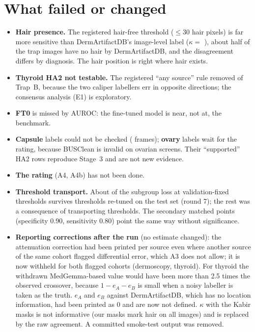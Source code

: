 \section{What failed or changed}
\begin{itemize}[leftmargin=*]\itemsep1pt
\item \textbf{Hair presence.} The registered hair-free threshold ($\le30$ hair pixels) is far more sensitive than
DermArtifactDB's image-level label ($\kappa=$ \sEightDermKappa), about half of the trap images have no hair by
DermArtifactDB, and the disagreement differs by diagnosis. The hair position is right where hair exists.
\item \textbf{Thyroid HA2 not testable.} The registered ``any source'' rule removed \sEightContratrapB{} of Trap~B, because
the two caliper labellers err in opposite directions; the consensus analysis (E1) is exploratory.
\item \textbf{FT0} is missed by \sEightFTZeroGap{} AUROC: the fine-tuned model is near, not at, the benchmark.
\item \textbf{Capsule} labels could not be checked (\sEightNCap{} frames); \textbf{ovary} labels wait for the rating,
because BUSClean is invalid on ovarian screens. Their ``supported'' HA2 rows reproduce Stage~3 and are not new evidence.
\item \textbf{The rating} (A4, A4b) has not been done.
\item \textbf{Threshold transport.} About \sEightTMShare{} of the subgroup loss at validation-fixed thresholds survives
thresholds re-tuned on the test set (round 7); the rest was a consequence of transporting thresholds. The secondary matched
points (specificity 0.90, sensitivity 0.80) point the same way without significance.
\item \textbf{Reporting corrections after the run} (no estimate changed): the attenuation correction had been printed per
source even where another source of the same cohort flagged differential error, which A3 does not allow; it is now
withheld for both flagged cohorts (dermoscopy, thyroid). For thyroid the withdrawn MedGemma-based value would have been
more than 2.5 times the observed crossover, because $1-e_A-e_B$ is small when a noisy labeller is taken as the truth.
$e_A$ and $e_B$ against DermArtifactDB, which has no location information, had been printed as 0 and are now not defined.
$\kappa$ with the Kabir masks is not informative (our masks mark hair on all \sEightNKabir{} images) and is replaced by the
raw agreement. A committed smoke-test output was removed.
\end{itemize}


